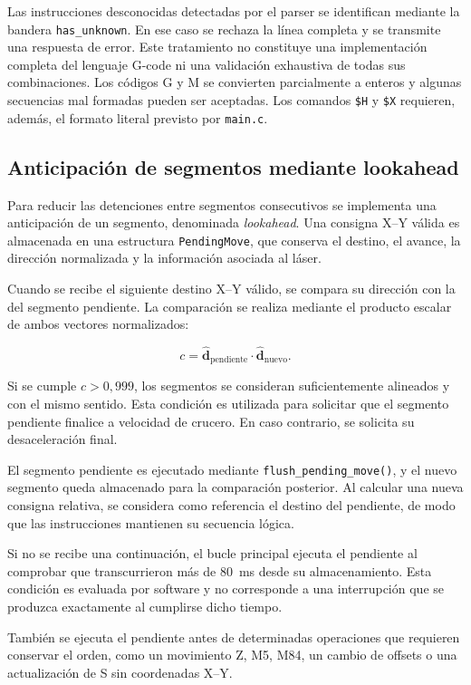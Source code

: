 \documentclass[blue,fullpaper]{ludusofficial}  %
\begin{document}
Las instrucciones desconocidas detectadas por el parser
se identifican mediante la bandera \texttt{has\_unknown}.
En ese caso se rechaza la línea completa y se transmite
una respuesta de error. Este tratamiento no constituye
una implementación completa del lenguaje G-code ni
una validación exhaustiva de todas sus combinaciones. Los códigos G y M se convierten parcialmente a enteros y algunas secuencias mal formadas pueden ser aceptadas. Los comandos \texttt{\$H} y \texttt{\$X} requieren, además, el formato literal previsto por \texttt{main.c}.

\subsection{Anticipación de segmentos mediante lookahead}
\label{subsec:lookahead}

Para reducir las detenciones entre segmentos consecutivos
se implementa una anticipación de un segmento,
denominada \textit{lookahead}. Una consigna X--Y válida
es almacenada en una estructura \texttt{PendingMove},
que conserva el destino, el avance, la dirección
normalizada y la información asociada al láser.

Cuando se recibe el siguiente destino X--Y válido,
se compara su dirección con la del segmento pendiente.
La comparación se realiza mediante el producto escalar
de ambos vectores normalizados:

\[
c = \hat{\mathbf{d}}_{\mathrm{pendiente}}
    \cdot \hat{\mathbf{d}}_{\mathrm{nuevo}}.
\]

Si se cumple $c > 0{,}999$, los segmentos se consideran
suficientemente alineados y con el mismo sentido.
Esta condición es utilizada para solicitar que
el segmento pendiente finalice a velocidad de crucero.
En caso contrario, se solicita su desaceleración final.

El segmento pendiente es ejecutado mediante
\texttt{flush\_pending\_move()}, y el nuevo segmento
queda almacenado para la comparación posterior.
Al calcular una nueva consigna relativa, se considera
como referencia el destino del pendiente, de modo
que las instrucciones mantienen su secuencia lógica.

Si no se recibe una continuación, el bucle principal
ejecuta el pendiente al comprobar que transcurrieron
más de 80~ms desde su almacenamiento. Esta condición
es evaluada por software y no corresponde a una
interrupción que se produzca exactamente al cumplirse
dicho tiempo.

También se ejecuta el pendiente antes de determinadas
operaciones que requieren conservar el orden,
como un movimiento Z, M5, M84, un cambio de offsets
o una actualización de S sin coordenadas X--Y.
\end{document}
